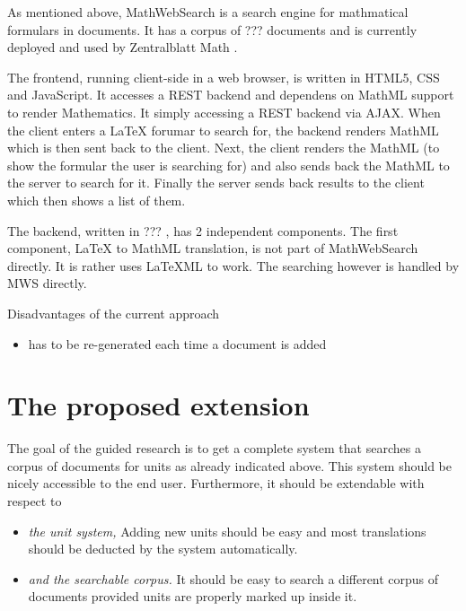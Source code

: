 \documentclass[11pt]{article}
\begin{document}
As mentioned above, MathWebSearch is a search engine for mathmatical formulars in documents. It has a corpus of ??? documents  and is currently deployed and used by Zentralblatt Math .

The frontend, running client-side in a web browser, is written in HTML5, CSS and JavaScript. It accesses a REST backend and dependens on MathML support to render Mathematics. It simply accessing a REST backend via AJAX. When the client enters a LaTeX forumar to search for, the backend renders MathML which is then sent back to the client. Next, the client renders the MathML (to show the formular the user is searching for) and also sends back the MathML to the server to search for it. Finally the server sends back results to the client which then shows a list of them.

The backend, written in ??? , has 2 independent components. The first component, LaTeX to MathML translation, is not part of MathWebSearch directly. It is rather uses LaTeXML to work. The searching however is handled by MWS directly.



Disadvantages of the current approach
\begin{itemize}
  \item has to be re-generated each time a document is added
\end{itemize}

\section{The proposed extension}
\label{sec:extension}

The goal of the guided research is to get a complete system that searches a corpus of documents for units as already indicated above. This system should be nicely accessible to the end user. Furthermore, it should be extendable with respect to
\begin{itemize}
  \item \textit{the unit system, } Adding new units should be easy and most translations should be deducted by the system automatically.
  \item \textit{and the searchable corpus. } It should be easy to search a different corpus of documents provided units are properly marked up inside it.
\end{itemize}
\end{document}
